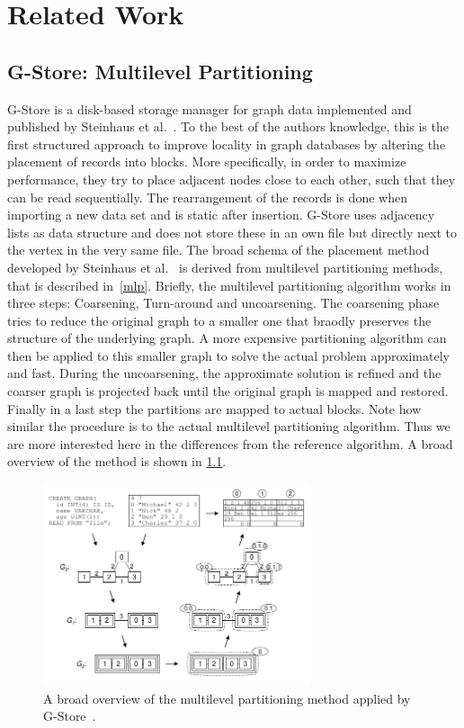 \chapter{Related Work}
\section{G-Store: Multilevel Partitioning}
    G-Store is a disk-based storage manager for graph data implemented and published by Steinhaus et al.~\autocite{steinhaus2010g}. 
    To the best of the authors knowledge, this is the first structured approach to improve locality in graph databases by altering the placement of records into blocks.
    More specifically, in order to maximize performance, they try to place adjacent nodes close to each other, such that they can be read sequentially. 
    The rearrangement of the records is done when importing a new data set and is static after insertion.
    G-Store uses adjacency lists as data structure and does not store these in an own file but directly next to the vertex in the very same file.
    The broad schema of the placement method developed by Steinhaus et al.~\autocite{steinhaus2010g} is derived from multilevel partitioning methods, that is described in~\ref{mlp}.
    Briefly, the multilevel partitioning algorithm works in three steps: Coarsening, Turn-around and uncoarsening. 
    The coarsening phase tries to reduce the original graph to a smaller one that braodly preserves the structure of the underlying graph. 
    A more expensive partitioning algorithm can then be applied to this smaller graph to solve the actual problem approximately and fast.
    During the uncoarsening, the approximate solution is refined and the coarser graph is projected back until the original graph is mapped and restored.
    Finally in a last step the partitions are mapped to actual blocks.
    Note how similar the procedure is to the actual multilevel partitioning algorithm. 
    Thus we are more interested here in the differences from the reference algorithm.
    A broad overview of the method is shown in \ref{g-store}.
    
    \begin{figure}[htp]
        \begin{center}
            \includegraphics[keepaspectratio,width=0.7\textwidth]{img/06-rel_w/g-store.png}
        \end{center}
        \caption{A broad overview of the multilevel partitioning method applied by G-Store~\autocite{steinhaus2010g}.} 
        \label{g-store}
    \end{figure}

